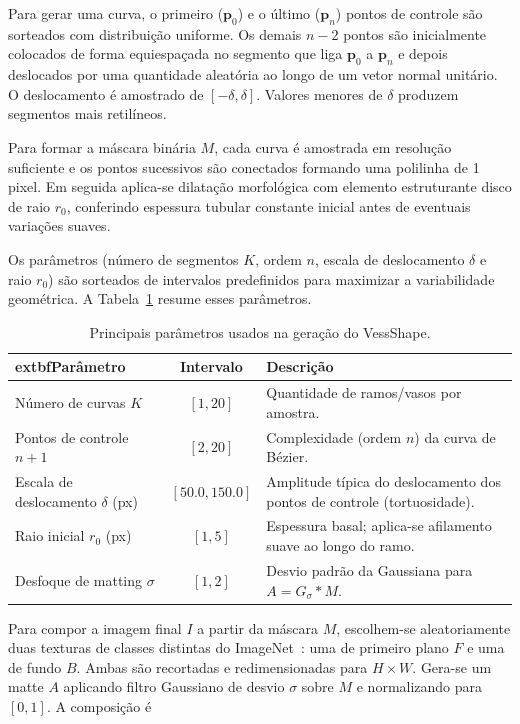 \documentclass[%
reprint,
nofootinbib,
 amsmath,amssymb,
aps,
superscriptaddress,
showkeys,
longbibliography
]{revtex4-1}
\begin{document}
Para gerar uma curva, o primeiro ($\mathbf{p}_0$) e o último ($\mathbf{p}_n$) pontos de controle são sorteados com distribuição uniforme. Os demais $n-2$ pontos são inicialmente colocados de forma equiespaçada no segmento que liga $\mathbf{p}_0$ a $\mathbf{p}_n$ e depois deslocados por uma quantidade aleatória ao longo de um vetor normal unitário. O deslocamento é amostrado de $[-\delta,\delta]$. Valores menores de $\delta$ produzem segmentos mais retilíneos.

Para formar a máscara binária $M$, cada curva é amostrada em resolução suficiente e os pontos sucessivos são conectados formando uma polilinha de 1 pixel. Em seguida aplica-se dilatação morfológica com elemento estruturante disco de raio $r_0$, conferindo espessura tubular constante inicial antes de eventuais variações suaves.

Os parâmetros (número de segmentos $K$, ordem $n$, escala de deslocamento $\delta$ e raio $r_0$) são sorteados de intervalos predefinidos para maximizar a variabilidade geométrica. A Tabela~\ref{tab:vessshape_params} resume esses parâmetros.

\begin{table}[t]
\caption{Principais parâmetros usados na geração do VessShape.}
\label{tab:vessshape_params}
\centering
\begin{tabularx}{\textwidth}{l c X}
\hline
    	extbf{Parâmetro} & \textbf{Intervalo} & \textbf{Descrição} \\
\hline
Número de curvas $K$ & $[1,20]$ & Quantidade de ramos/vasos por amostra. \\
Pontos de controle $n{+}1$ & $[2,20]$ & Complexidade (ordem $n$) da curva de Bézier. \\
Escala de deslocamento $\delta$ (px) & $[50.0,150.0]$ & Amplitude típica do deslocamento dos pontos de controle (tortuosidade). \\
Raio inicial $r_{0}$ (px) & $[1,5]$ & Espessura basal; aplica-se afilamento suave ao longo do ramo. \\
Desfoque de matting $\sigma$ & $[1,2]$ & Desvio padrão da Gaussiana para $A = G_{\sigma} * M$. \\
\hline
\end{tabularx}
\end{table}

Para compor a imagem final $I$ a partir da máscara $M$, escolhem-se aleatoriamente duas texturas de classes distintas do ImageNet~\cite{JiaDeng2009}: uma de primeiro plano $F$ e uma de fundo $B$. Ambas são recortadas e redimensionadas para $H \times W$. Gera-se um matte $A$ aplicando filtro Gaussiano de desvio $\sigma$ sobre $M$ e normalizando para $[0,1]$. A composição é
\end{document}
